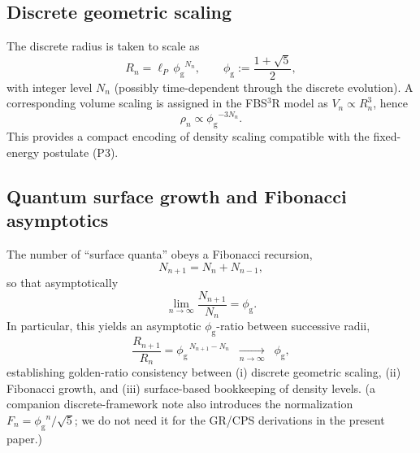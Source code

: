 \documentclass[
  reprint,
  amsmath,amssymb,
  aps,
  prd,
  superscriptaddress,
  nofootinbib,
  longbibliography
]{revtex4-2}
\newcommand{\goldconst}{\ensuremath{\phi_{\!\mathrm{g}}}} %
\begin{document}
\subsection{Discrete geometric scaling}
\label{subsec:FBS3Rscaling}
The discrete radius is taken to scale as
\begin{equation}
R_n = \ell_P\,\goldconst^{N_n},
\qquad
\goldconst:=\frac{1+\sqrt{5}}{2},
\label{eq:FBS3R_Rn}
\end{equation}
with integer level $N_n$ (possibly time-dependent through the discrete evolution).
A corresponding volume scaling is assigned in the FBS$^{3}$R model as $V_n\propto R_n^3$, hence
\begin{equation}
\rho_n \propto \goldconst^{-3N_n}.
\end{equation}
This provides a compact encoding of density scaling compatible with the fixed-energy postulate (P3).
\subsection{Quantum surface growth and Fibonacci asymptotics}
\label{subsec:FBS3Rfibonacci}
The number of ``surface quanta'' obeys a Fibonacci recursion,
\begin{equation}
N_{n+1}=N_n+N_{n-1},
\end{equation}
so that asymptotically
\begin{equation}
\lim_{n\to\infty}\frac{N_{n+1}}{N_n}=\goldconst.
\end{equation}
In particular, this yields an asymptotic $\goldconst$-ratio between successive radii,
\begin{equation}
\frac{R_{n+1}}{R_n}
=\goldconst^{\,N_{n+1}-N_n}
\;\;\xrightarrow[n\to\infty]{}\;\;
\goldconst,
\label{eq:FBS3R_phiConsistency}
\end{equation}
establishing golden-ratio consistency between (i) discrete geometric scaling, (ii) Fibonacci growth, and (iii) surface-based
bookkeeping of density levels.
(a companion discrete-framework note also introduces the normalization $F_n=\goldconst^n/\sqrt{5}$; we do not need it for the GR/CPS
derivations in the present paper.)
\end{document}
